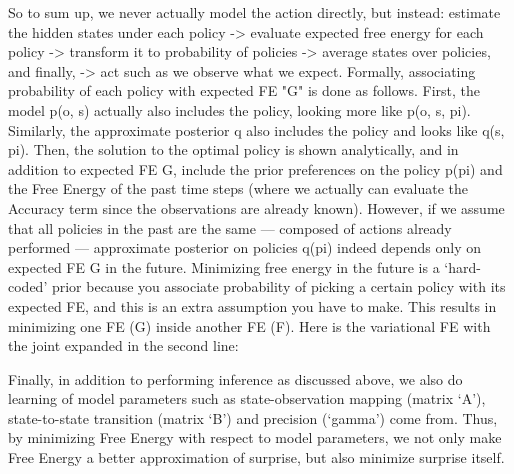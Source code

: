 \documentclass[12pt]{article}
\begin{document}
So to sum up, we never actually model the action directly, but instead: estimate the hidden states under each policy -> evaluate expected free energy for each policy -> transform it to probability of policies -> average states over policies, and finally, -> act such as we observe what we expect.
Formally, associating probability of each policy with expected FE "G" is done as follows. First, the model p(o, s) actually also includes the policy, looking more like p(o, s, pi). Similarly, the approximate posterior q also includes the policy and looks like q(s, pi). Then, the solution to the optimal policy is shown analytically, and in addition to expected FE G, include the prior preferences on the policy p(pi) and the Free Energy of the past time steps (where we actually can evaluate the Accuracy term since the observations are already known). However, if we assume that all policies in the past are the same — composed of actions already performed — approximate posterior on policies q(pi) indeed depends only on expected FE G in the future. Minimizing free energy in the future is a ‘hard-coded’ prior because you associate probability of picking a certain policy with its expected FE, and this is an extra assumption you have to make. This results in minimizing one FE (G) inside another FE (F). Here is the variational FE with the joint expanded in the second line:

Finally, in addition to performing inference as discussed above, we also do learning of model parameters such as state-observation mapping (matrix ‘A’), state-to-state transition (matrix ‘B’) and precision (‘gamma’) come from. Thus, by minimizing Free Energy with respect to model parameters, we not only make Free Energy a better approximation of surprise, but also minimize surprise itself.
\end{document}
